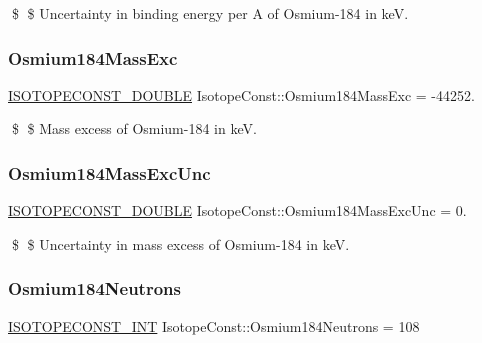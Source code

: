 \$ \$ Uncertainty in binding energy per A of Osmium-\/184 in keV. \mbox{\label{group___isotope_const-_osmium-_os184_ga6e545c259a1b4fcfd582305ac70510f2}} 
\subsubsection{\texorpdfstring{Osmium184\+Mass\+Exc}{Osmium184MassExc}}
{\footnotesize\ttfamily \mbox{\hyperlink{group___isotope_const-_macros_ga8f45a7272ce02c0b4c65c44636ed719a}{I\+S\+O\+T\+O\+P\+E\+C\+O\+N\+S\+T\+\_\+\+D\+O\+U\+B\+LE}} Isotope\+Const\+::\+Osmium184\+Mass\+Exc = -\/44252.}

\$ \$ Mass excess of Osmium-\/184 in keV. \mbox{\label{group___isotope_const-_osmium-_os184_gae64a340f8a9db7797ba20096bc93d4a3}} 
\subsubsection{\texorpdfstring{Osmium184\+Mass\+Exc\+Unc}{Osmium184MassExcUnc}}
{\footnotesize\ttfamily \mbox{\hyperlink{group___isotope_const-_macros_ga8f45a7272ce02c0b4c65c44636ed719a}{I\+S\+O\+T\+O\+P\+E\+C\+O\+N\+S\+T\+\_\+\+D\+O\+U\+B\+LE}} Isotope\+Const\+::\+Osmium184\+Mass\+Exc\+Unc = 0.}

\$ \$ Uncertainty in mass excess of Osmium-\/184 in keV. \mbox{\label{group___isotope_const-_osmium-_os184_ga8b46bdde77c288cf507022a1cf920f9f}} 
\subsubsection{\texorpdfstring{Osmium184\+Neutrons}{Osmium184Neutrons}}
{\footnotesize\ttfamily \mbox{\hyperlink{group___isotope_const-_macros_ga5f18360b3e99483a35c32d789e62621c}{I\+S\+O\+T\+O\+P\+E\+C\+O\+N\+S\+T\+\_\+\+I\+NT}} Isotope\+Const\+::\+Osmium184\+Neutrons = 108}


